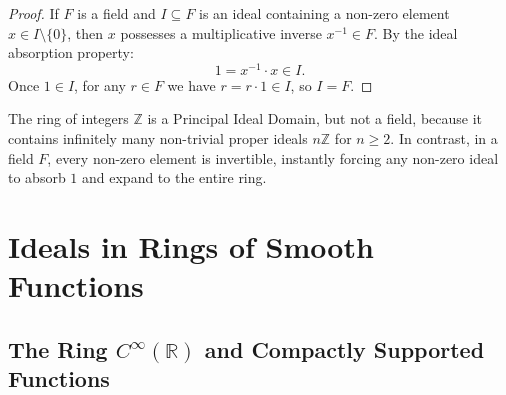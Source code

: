 \begin{content}



\begin{proof}
If $F$ is a field and $I \subseteq F$ is an ideal containing a non-zero element $x \in I \setminus \{0\}$, then $x$ possesses a multiplicative inverse $x^{-1} \in F$. By the ideal absorption property:
\[
1 = x^{-1} \cdot x \in I.
\]
Once $1 \in I$, for any $r \in F$ we have $r = r \cdot 1 \in I$, so $I = F$.
\end{proof}
\end{content}

\begin{aiNote}
The ring of integers $\mathbb{Z}$ is a Principal Ideal Domain, but not a field, because it contains infinitely many non-trivial proper ideals $n\mathbb{Z}$ for $n \ge 2$. In contrast, in a field $F$, every non-zero element is invertible, instantly forcing any non-zero ideal to absorb $1$ and expand to the entire ring.
\end{aiNote}

\section{Ideals in Rings of Smooth Functions}

\subsection{The Ring \texorpdfstring{$C^\infty(\mathbb{R})$}{C-infinity(R)} and Compactly Supported Functions}

